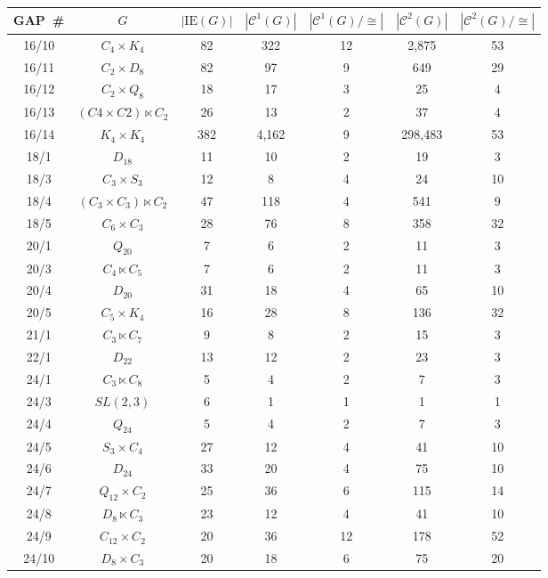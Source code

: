 \documentclass{ws-ijac}
\newcommand{\GAP}      {{\sf GAP}}
\newcommand{\calC}{\mathcal{C}}
\begin{document}
\begin{table}[h!]
{\begin{tabular}{@{}ccccccc@{}} \toprule
	{\GAP\ }\# 
	    & $G$ 
	        & $|\mathrm{IE}(G)|$ 
	            & $|\calC^1(G)|$ 
	                & $|\calC^1(G)/\cong |$ 
	                    & $|\calC^{2}(G)|$ 
	                        & $|\calC^{2}(G)/\cong |$  \\ 
\hline 	 
	16/10 & $C_4 \times K_4$ & 82 & 322 & 12 & 2,875 & 53 \\ 
	16/11 & $C_2 \times D_8$ & 82 & 97 & 9 & 649 & 29 \\ 
	16/12 & $C_2 \times Q_8$ & 18 & 17 & 3 & 25 & 4 \\ 
	16/13 & $(C4 \times C2) \ltimes C_2$ & 26 & 13 & 2 & 37 & 4 \\ 
	16/14 & $K_4 \times K_4$ & 382 & 4,162 & 9 & 298,483 & 53  \\ 
	18/1 & $D_{18}$ & 11 & 10 & 2 & 19 & 3 \\ 
	18/3 & $C_3 \times S_3$ & 12 & 8 & 4 & 24 & 10 \\ 
	18/4 & $(C_3 \times C_3) \ltimes C_2$ & 47 & 118 & 4 & 541 & 9 \\ 
	18/5 & $C_6 \times C_3$ & 28 & 76 & 8 & 358 & 32 \\ 
	20/1 & $Q_{20}$ & 7 & 6 & 2 & 11 & 3 \\ 
	20/3 & $C_4 \ltimes C_5$ & 7 & 6 & 2 & 11 & 3 \\ 
	20/4 & $D_{20}$ & 31 & 18 & 4 & 65 & 10 \\ 
	20/5 & $C_5 \times K_4$ & 16 & 28 & 8 & 136 & 32 \\ 
	21/1 & $C_3 \ltimes C_7$ & 9 & 8 & 2 & 15 & 3 \\ 
	22/1 & $D_{22}$ & 13 & 12 & 2 & 23 & 3 \\ 
	24/1 & $C_3 \ltimes C_8$ & 5 & 4 & 2 & 7 & 3 \\ 
	24/3 & $SL(2,3)$ & 6 & 1 & 1 & 1 & 1 \\ 
	24/4 & $Q_{24}$ & 5 & 4 & 2 & 7 & 3 \\ 
	24/5 & $S_3 \times C_4$ & 27 & 12 & 4 & 41 & 10 \\ 
	24/6 & $D_{24}$ & 33 & 20 & 4 & 75 & 10 \\ 
	24/7 & $Q_{12} \times C_2$ & 25 & 36 & 6 & 115 & 14 \\ 
	24/8 & $D_8 \ltimes C_3$ & 23 & 12 & 4 & 41 & 10 \\ 
	24/9 & $C_{12} \times C_2$ & 20 & 36 & 12 & 178 & 52 \\ 
	24/10 & $D_8 \times C_3$ & 20 & 18 & 6 & 75 & 20 \\ 

\end{tabular}}
\end{table}
\end{document}
